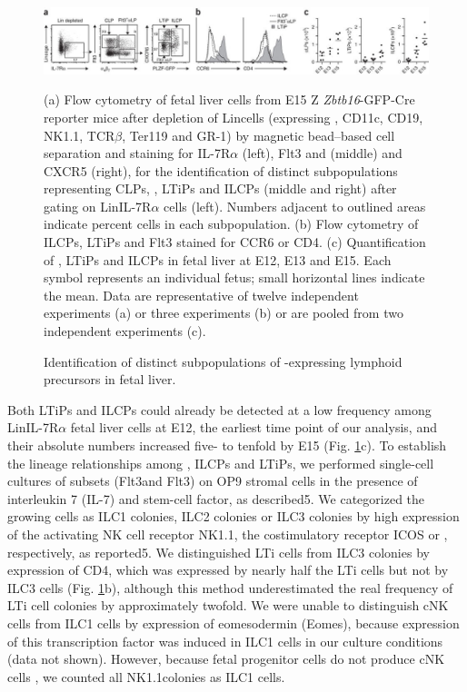 \begin{figure}[h]
\begin{center}
	\includegraphics[width=\textwidth]{figures/chapter3/F1}
\end{center}
	\caption{Identification of distinct subpopulations of \ab-expressing lymphoid precursors in fetal liver.} 
	(a) Flow cytometry of fetal liver cells from E15 Z \textit{Zbtb16}-GFP-Cre reporter mice after depletion of Lin\UP cells (expressing \CDte, CD11c, CD19, NK1.1, TCR$\beta$, Ter119 and GR-1) by magnetic bead–based cell separation and staining for IL-7R$\alpha$ (left), Flt3 and \ab{} (middle) and CXCR5 (right), for the identification of distinct subpopulations representing CLPs, \aLPs, LTiPs and ILCPs (middle and right) after gating on Lin\UM IL-7R$\alpha$\UP{} cells (left). Numbers adjacent to outlined areas indicate percent cells in each subpopulation. (b) Flow cytometry of ILCPs, LTiPs and Flt3\UM{} \aLPs stained for CCR6 or CD4. (c) Quantification of \aLPs, LTiPs and ILCPs in fetal liver at E12, E13 and E15. Each symbol represents an individual fetus; small horizontal lines indicate the mean. Data are representative of twelve independent experiments (a) or three experiments (b) or are pooled from two independent experiments (c).
	\label{fig:chap3_F1}
\end{figure}

Both LTiPs and ILCPs could already be detected at a low frequency among Lin\UM IL-7R$\alpha$\UP \ab\UP{} fetal liver cells at E12, the earliest time point of our analysis, and their absolute numbers increased five- to tenfold by E15 (Fig. \ref{fig:chap3_F1}c). To establish the lineage relationships among \aLPs, ILCPs and LTiPs, we performed single-cell cultures of \aLP subsets (Flt3\UP and Flt3\UM) on OP9 stromal cells in the presence of interleukin 7 (IL-7) and stem-cell factor, as described5. We categorized the growing cells as ILC1 colonies, ILC2 colonies or ILC3 colonies by high expression of the activating NK cell receptor NK1.1, the costimulatory receptor ICOS or \ab, respectively, as reported5. We distinguished LTi cells from ILC3 colonies by expression of CD4, which was expressed by nearly half the LTi cells but not by ILC3 cells (Fig. \ref{fig:chap3_F1}b), although this method underestimated the real frequency of LTi cell colonies by approximately twofold. We were unable to distinguish cNK cells from ILC1 cells by expression of eomesodermin (Eomes), because expression of this transcription factor was induced in ILC1 cells in our culture conditions (data not shown). However, because fetal progenitor cells do not produce cNK cells \cite{constantinides2015}, we counted all NK1.1\UP colonies as ILC1 cells.

